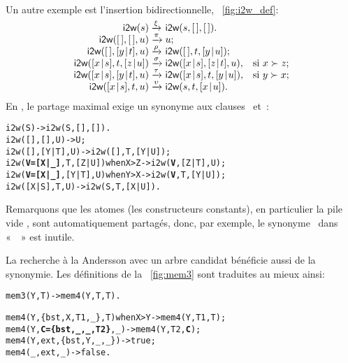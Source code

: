 \noindent Un autre exemple est l'insertion bidirectionnelle,
\fig~\vref{fig:i2w_def}:
\begin{equation*}
\begin{array}{@{}r@{\;}l@{\;}ll@{}}
\fun{i2w}(s)         & \xrightarrow{\smash{\xi}}
                     & \fun{i2w}(s,\el,\el).\\
\fun{i2w}(\el,\el,u) & \xrightarrow{\smash{\pi}}
                     & u;\\
\fun{i2w}(\el,\cons{y}{t},u)
                     & \xrightarrow{\smash{\rho}}
                     & \fun{i2w}(\el,t,\cons{y}{u});\\
\fun{i2w}(\cons{x}{s},t,\cons{z}{u})
                     & \xrightarrow{\smash{\sigma}}
                     & \fun{i2w}(\cons{x}{s},\cons{z}{t},u),
                     & \text{si \(x \succ z\)};\\
\fun{i2w}(\cons{x}{s},\cons{y}{t},u)
                     & \xrightarrow{\smash{\tau}}
                     & \fun{i2w}(\cons{x}{s},t,\cons{y}{u}),
                     & \text{si \(y \succ x\)};\\
\fun{i2w}(\cons{x}{s},t,u)
                     & \xrightarrow{\smash{\upsilon}}
                     & \fun{i2w}(s,t,\cons{x}{u}).
\end{array}
\end{equation*}
En \Erlang, le partage maximal exige un synonyme aux clauses
\clause{\sigma}~et~\clause{\tau}:
\begin{alltt}
i2w(S)                              -> i2w(S,[],[]).
i2w(     [],   [],    U)            -> U;
i2w(     [],[Y|T],    U)            -> i2w([],T,[Y|U]);
i2w(\textbf{V=[X|\_]},    T,[Z|U]) when X > Z -> i2w(\textbf{V},[Z|T],U);
i2w(\textbf{V=[X|\_]},[Y|T],    U) when Y > X -> i2w(\textbf{V},T,[Y|U]);
i2w(  [X|S],    T,    U)            -> i2w(S,T,[X|U]).
\end{alltt}
Remarquons que les atomes (les constructeurs constants), en
particulier la pile vide \erlcode{[]}, sont automatiquement partagés,
donc, par exemple, le synonyme~ dans «~~» est inutile.

La recherche à la Andersson avec un arbre candidat bénéficie aussi de
la synonymie. Les définitions de la \fig~\vref{fig:mem3} sont
traduites au mieux ainsi:
\begin{alltt}
mem3(Y,T) -> mem4(Y,T,T).

mem4(Y,  \{bst,X,T1,_\},        T) when X > Y -> mem4(Y,T1,T);
mem4(Y,\textbf{C=\{bst,_,_,T2\}},        _)            -> mem4(Y,T2,\textbf{C});
mem4(Y,         ext,\{bst,Y,_,_\})            -> true;
mem4(_,           ext,        _)            -> false.
\end{alltt}

